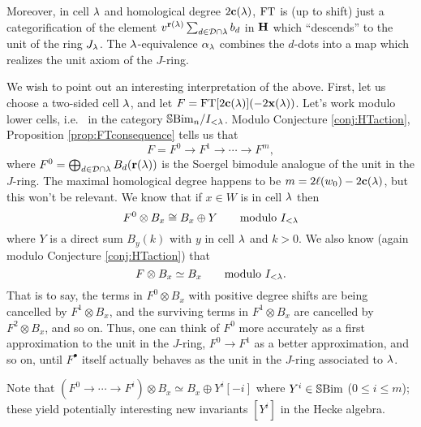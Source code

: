 Moreover, in cell $\lambda$ and homological degree $2\mathbf{c}(\lambda)$, $\operatorname{FT}$ is (up to shift) just a categorification of the element $v^{\mathbf{r}(\lambda)} \sum_{d \in {\mathcal{D}} \cap \lambda} b_d$ in ${\mathbf H}$ which ``descends'' to the unit of the ring $J_\lambda$. The $\lambda$-equivalence $\alpha_\lambda$ combines the $d$-dots into a map which realizes the unit axiom of the $J$-ring.

\begin{remark} \label{rmk:syzygy}
We wish to point out an interesting interpretation of the above.  First, let us choose a two-sided cell $\lambda$, and let $F = \operatorname{FT}[2\mathbf{c}(\lambda)](-2\mathbf{x}(\lambda))$. Let's work modulo lower cells, i.e.~ in the category ${\mathbb{S}}{\rm Bim }_n/I_{<\lambda}$.  Modulo Conjecture \ref{conj:HTaction}, Proposition \ref{prop:FTconsequence} tells us that
\[
F = F^0\rightarrow F^1\rightarrow \cdots \rightarrow F^{m},
\]
where $F^0 = \bigoplus_{d\in {\mathcal{D}}\cap \lambda} B_d(\mathbf{r}(\lambda))$ is the Soergel bimodule analogue of the unit in the $J$-ring.  The maximal homological degree happens to be $m=2\ell(w_0)-2\mathbf{c}(\lambda)$, but this won't be relevant.  We know that if $x\in W$ is in cell $\lambda$ then
\[
F^0\otimes B_x \cong B_x \oplus Y \qquad \text{modulo $I_{<\lambda}$}
\]
where $Y$ is a direct sum $B_y(k)$ with $y$ in cell $\lambda$ and $k>0$.  We also know (again modulo Conjecture \ref{conj:HTaction}) that
\[
F\otimes B_x \simeq B_x \qquad \text{modulo $I_{<\lambda}$}.
\]
That is to say, the terms in $F^0\otimes B_x$ with positive degree shifts are being cancelled by $F^1\otimes B_x$, and the surviving terms in $F^1\otimes B_x$ are cancelled by $F^2\otimes B_x$, and so on.  Thus, one can think of $F^0$ more accurately as a first approximation to the unit in the $J$-ring, $F^0\rightarrow F^1$ as a better approximation, and so on, until $F^\bullet$ itself actually behaves as the unit in the $J$-ring associated to $\lambda$.

Note that $(F^0\rightarrow \cdots \rightarrow F^i)\otimes B_x\simeq B_x \oplus Y^i[-i]$ where $Y^i\in {\mathbb{S}}{\rm Bim }$ ($0\leq i\leq m$); these yield potentially interesting new invariants $[Y^i]$ in the Hecke algebra.
\end{remark}

